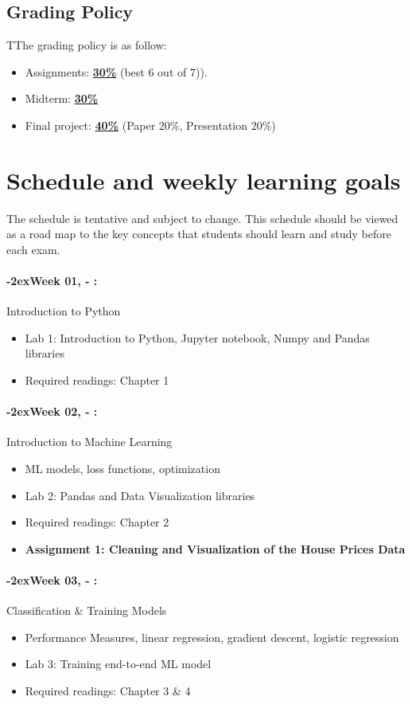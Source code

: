 \documentclass[11pt]{article}
\newcommand{\week}[1]{%
  \paragraph*{\kern-2ex\quad #1, \syldate{\today} - \AdvanceDate[4]\syldate{\today}:}%
  \ifdim\wd1=\wd\MONDAY
    \AdvanceDate[7]
  \else
    \AdvanceDate[7]
  \fi%
}
\begin{document}
\subsection*{Grading Policy}
TThe grading policy is as follow:
\begin{itemize}
	\item Assignments: \underline{\textbf{30\%}} (best 6 out of 7)).
	\item Midterm: \underline{\textbf{30\%}}
	\item Final project: \underline{\textbf{40\%}} (Paper 20\%, Presentation 20\%)
\end{itemize}






\newpage
\section*{Schedule and weekly learning goals}

The schedule is tentative and subject to change. This schedule should be viewed as a road map to the key concepts that students should learn and study before each exam.

\SetDate[17/01/2022]
\week{Week 01} Introduction to Python 
\begin{itemize}
\item Lab 1: Introduction to Python, Jupyter notebook, Numpy and Pandas libraries
\item Required readings: Chapter 1
\end{itemize}

\week{Week 02} Introduction to Machine Learning
\begin{itemize}
\item ML models, loss functions, optimization
\item Lab 2: Pandas and Data Visualization libraries 
\item Required readings: Chapter 2 
\item \textbf{Assignment 1: Cleaning and Visualization of the House Prices Data}
\end{itemize}

\week{Week 03} Classification {\&} Training Models
\begin{itemize}
\item Performance Measures, linear regression, gradient descent, logistic regression
\item Lab 3: Training end-to-end ML model
\item Required readings: Chapter 3 {\&} 4
\end{itemize}
\end{document}

